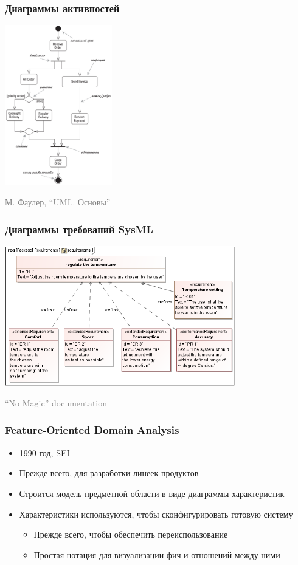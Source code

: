 \documentclass[xetex,mathserif,serif]{beamer}
\newcommand{\attribution}[1] {
	\begin{flushright}\begin{scriptsize}\textcolor{gray}{\textcopyright\; #1}\end{scriptsize}\end{flushright}
}
\begin{document}
	\begin{frame}
		\frametitle{Диаграммы активностей}
		\begin{center}
			\includegraphics[width=0.35\textwidth]{activityDiagram.png}
		\end{center}
		\attribution{М. Фаулер, ``UML. Основы''}
	\end{frame}

	\begin{frame}
		\frametitle{Диаграммы требований SysML}
		\begin{center}
			\includegraphics[width=0.75\textwidth]{sysMlRequirementDiagram.png}
		\end{center}
		\attribution{``No Magic'' documentation}
	\end{frame}

	\begin{frame}
		\frametitle{Feature-Oriented Domain Analysis}
		\begin{itemize}
			\item 1990 год, SEI
			\item Прежде всего, для разработки линеек продуктов
			\item Строится модель предметной области в виде диаграммы характеристик
			\item Характеристики используются, чтобы сконфигурировать готовую систему
			\begin{itemize}
				\item Прежде всего, чтобы обеспечить переиспользование
				\item Простая нотация для визуализации фич и отношений между ними
			\end{itemize}
		\end{itemize}
	\end{frame}
\end{document}
